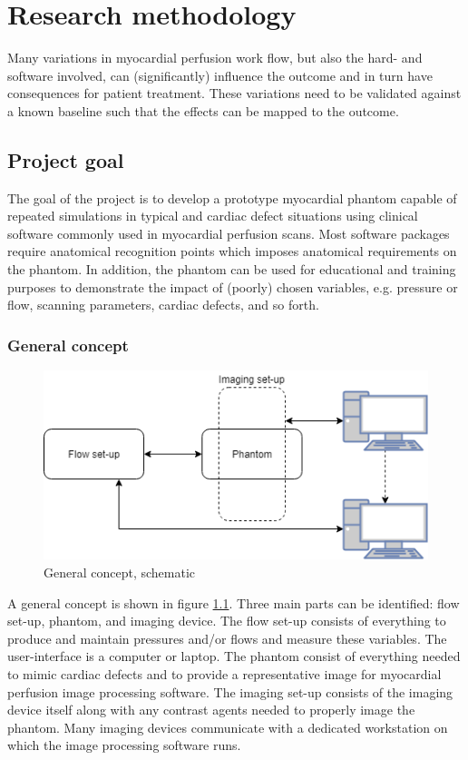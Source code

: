 \chapter{Research methodology}
\label{ch:res_metho}

Many variations in myocardial perfusion work flow, but also the hard- and software involved, can (significantly) influence the outcome and in turn have consequences for patient treatment. These variations need to be validated against a known baseline such that the effects can be mapped to the outcome.

\section{Project goal}
The goal of the project is to develop a prototype myocardial phantom capable of repeated simulations in typical and cardiac defect situations using clinical software commonly used in myocardial perfusion scans. Most software packages require anatomical recognition points which imposes anatomical requirements on the phantom. In addition, the phantom can be used for educational and training purposes to demonstrate the impact of (poorly) chosen variables, e.g. pressure or flow, scanning parameters, cardiac defects, and so forth.
\subsection{General concept}
\begin{figure}[b!]
	\begin{center}
		\includegraphics[width=0.75\linewidth]{images/global_setup.png}
	\end{center}
	\caption{General concept, schematic}
	\label{fig:general_concept}
\end{figure}
A general concept is shown in figure \ref{fig:general_concept}. Three main parts can be identified: flow set-up, phantom, and imaging device. The flow set-up consists of everything to produce and maintain pressures and/or flows and measure these variables. The user-interface is a computer or laptop. The phantom consist of everything needed to mimic cardiac defects and to provide a representative image for myocardial perfusion image processing software. The imaging set-up consists of the imaging device itself along with any contrast agents needed to properly image the phantom. Many imaging devices communicate with a dedicated workstation on which the image processing software runs.


